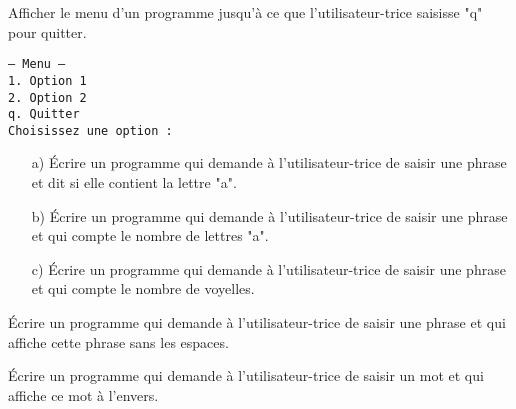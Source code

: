 \documentclass[11pt, a4paper]{book}
\begin{document}
\begin{exercice}
Afficher le menu d'un programme jusqu'à ce que l'utilisateur-trice saisisse "q" pour quitter.

\texttt{--- Menu --- \\
1. Option 1\\
2. Option 2\\
q. Quitter\\
Choisissez une option :}
\end{exercice}

\begin{exercice}
\begin{itemize}
\item[a)] Écrire un programme qui demande à l'utilisateur-trice de saisir une phrase et dit si elle contient la lettre "a".
\item[b)] Écrire un programme qui demande à l'utilisateur-trice de saisir une phrase et qui compte le nombre de lettres "a".
\item[c)] Écrire un programme qui demande à l'utilisateur-trice de saisir une phrase et qui compte le nombre de voyelles.
\end{itemize}

\begin{exercice}
Écrire un programme qui demande à l'utilisateur-trice de saisir une phrase et qui affiche cette phrase sans les espaces.
\end{exercice}

\end{exercice}


\begin{exercice}
Écrire un programme qui demande à l'utilisateur-trice de saisir un mot et qui affiche ce mot à l'envers.
\end{exercice}
\end{document}
